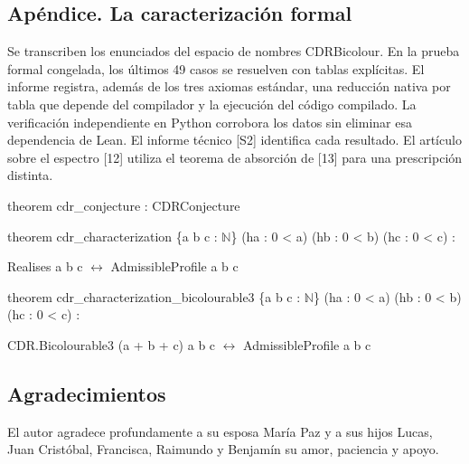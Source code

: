\documentclass[spanish,11pt,a4paper]{article}
\begin{document}
\subsection{Apéndice. La caracterización formal}\label{apuxe9ndice.-la-caracterizaciuxf3n-formal}

Se transcriben los enunciados del espacio de nombres CDRBicolour. En la prueba formal congelada, los últimos 49 casos se resuelven con tablas explícitas. El informe registra, además de los tres axiomas estándar, una reducción nativa por tabla que depende del compilador y la ejecución del código compilado. La verificación independiente en Python corrobora los datos sin eliminar esa dependencia de Lean. El informe técnico {[}S2{]} identifica cada resultado. El artículo sobre el espectro {[}12{]} utiliza el teorema de absorción de {[}13{]} para una prescripción distinta.

\begingroup\small\ttfamily\raggedright 
\noindent\hspace*{0.0em}theorem cdr\_\allowbreak{}conjecture : CDRConjecture\par
\noindent\hspace*{0.0em}\par
\noindent\hspace*{0.0em}theorem cdr\_\allowbreak{}characterization \{a b c : \(\mathbb N\)\} (ha : 0 < a) (hb : 0 < b) (hc : 0 < c) :\par
\noindent\hspace*{1.8em}Realises a b c \(\leftrightarrow\) AdmissibleProfile a b c\par
\noindent\hspace*{0.0em}\par
\noindent\hspace*{0.0em}theorem cdr\_\allowbreak{}characterization\_\allowbreak{}bicolourable3 \{a b c : \(\mathbb N\)\} (ha : 0 < a) (hb : 0 < b) (hc : 0 < c) :\par
\noindent\hspace*{1.8em}CDR.Bicolourable3 (a + b + c) a b c \(\leftrightarrow\) AdmissibleProfile a b c\par\endgroup

\subsection{Agradecimientos}\label{agradecimientos}

El autor agradece profundamente a su esposa María Paz y a sus hijos Lucas, Juan Cristóbal, Francisca, Raimundo y Benjamín su amor, paciencia y apoyo.
\end{document}

